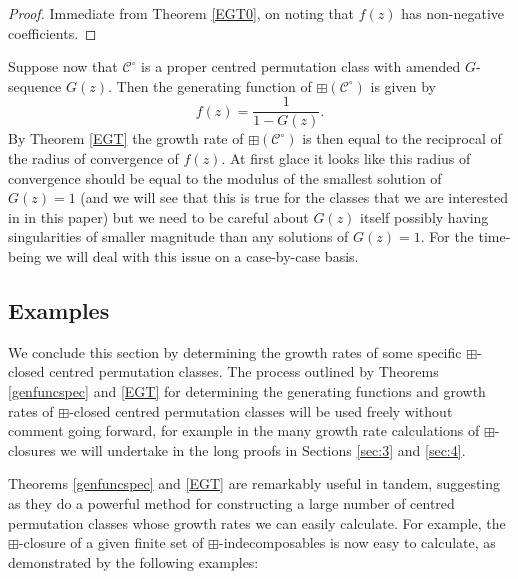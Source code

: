 \documentclass[11pt,a4paper]{article}
\theoremstyle{definition}
\begin{document}
\begin{proof}
Immediate from Theorem \ref{EGT0}, on noting that $f(z)$ has non-negative coefficients. \qedhere
\end{proof}

Suppose now that $\mathcal{C}^{\circ}$ is a proper centred permutation class with amended $G$-sequence $G(z)$. Then the generating function of $\boxplus\left(\mathcal{C}^{\circ}\right)$ is given by
\[
f(z) = \frac{1}{1 - G(z)}.
\]
By Theorem \ref{EGT} the growth rate of $\boxplus\left(\mathcal{C}^{\circ}\right)$ is then equal to the reciprocal of the radius of convergence of $f(z)$. At first glace it looks like this radius of convergence should be equal to the modulus of the smallest solution of $G(z)=1$ (and we will see that this is true for the classes that we are interested in in this paper) but we need to be careful about $G(z)$ itself possibly having singularities of smaller magnitude than any solutions of $G(z)=1$. For the time-being we will deal with this issue on a case-by-case basis.

\subsection{Examples} \label{sec:2.5}

We conclude this section by determining the growth rates of some specific $\boxplus$-closed centred permutation classes. The process outlined by Theorems \ref{genfuncspec}  and \ref{EGT} for determining the generating functions and growth rates of $\boxplus$-closed centred permutation classes will be used freely without comment going forward, for example in the many growth rate calculations of $\boxplus$-closures we will undertake in the long proofs in Sections \ref{sec:3} and \ref{sec:4}.

Theorems \ref{genfuncspec}  and \ref{EGT} are remarkably useful in tandem, suggesting as they do a powerful method for constructing a large number of centred permutation classes whose growth rates we can easily calculate. For example, the $\boxplus$-closure of a given finite set of $\boxplus$-indecomposables is now easy to calculate, as demonstrated by the following examples:
\end{document}
